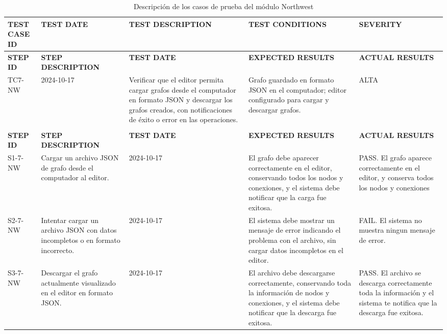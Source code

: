 \begin{longtable}{|p{2cm}|p{3cm}|p{3cm}|p{3cm}|p{3cm}|}
\caption{Descripción de los casos de prueba del módulo Northwest} \label{tab:casos_prueba} \\
\hline
\textbf{TEST CASE ID} & \textbf{TEST DATE} & \textbf{TEST DESCRIPTION} & \textbf{TEST CONDITIONS} & \textbf{SEVERITY                                                                                       \\} \\ \hline
\endfirsthead
\hline
\textbf{STEP ID} & \textbf{STEP DESCRIPTION} & \textbf{TEST DATE} & \textbf{EXPECTED RESULTS} & \textbf{ACTUAL RESULTS} \\ \hline
\endhead
TC7-NW & 2024-10-17 & Verificar que el editor permita cargar grafos desde el computador en formato JSON y descargar los grafos creados, con notificaciones de éxito o error en las operaciones. & Grafo guardado en formato JSON en el computador; editor configurado para cargar y descargar grafos. & ALTA                                                                                           \\ \\ \hline
\textbf{STEP ID} & \textbf{STEP DESCRIPTION} & \textbf{TEST DATE} & \textbf{EXPECTED RESULTS} & \textbf{ACTUAL RESULTS} \\ \hline
S1-7-NW & Cargar un archivo JSON de grafo desde el computador al editor. & 2024-10-17 & El grafo debe aparecer correctamente en el editor, conservando todos los nodos y conexiones, y el sistema debe notificar que la carga fue exitosa. & PASS. El grafo aparece correctamente en el editor, y conserva todos los nodos y conexiones \\ \hline
S2-7-NW & Intentar cargar un archivo JSON con datos incompletos o en formato incorrecto. & 2024-10-17 & El sistema debe mostrar un mensaje de error indicando el problema con el archivo, sin cargar datos incompletos en el editor. & FAIL. El sistema no muestra ningun mensaje de error. \\ \hline
S3-7-NW & Descargar el grafo actualmente visualizado en el editor en formato JSON. & 2024-10-17 & El archivo debe descargarse correctamente, conservando toda la información de nodos y conexiones, y el sistema debe notificar que la descarga fue exitosa. & PASS. El archivo se descarga correctamente toda la información y el sistema te notifica que la descarga fue exitosa. \\ \hline
\end{longtable}